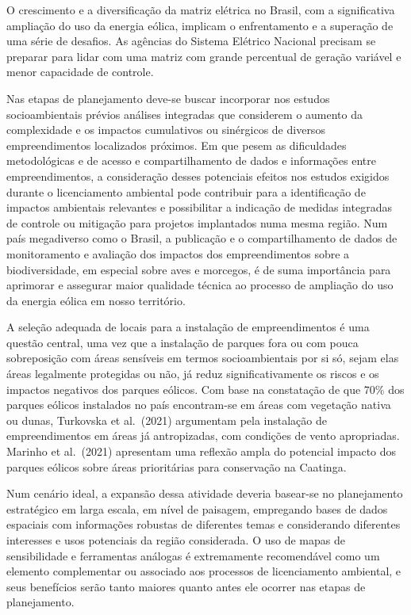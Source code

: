 \documentclass[
  oneside]{scrbook}
\begin{document}
O crescimento e a diversificação da matriz elétrica no Brasil, com a significativa ampliação do uso da energia eólica, implicam o enfrentamento e a superação de uma série de desafios. As agências do Sistema Elétrico Nacional precisam se preparar para lidar com uma matriz com grande percentual de geração variável e menor capacidade de controle.

Nas etapas de planejamento deve-se buscar incorporar nos estudos socioambientais prévios análises integradas que considerem o aumento da complexidade e os impactos cumulativos ou sinérgicos de diversos empreendimentos localizados próximos. Em que pesem as dificuldades metodológicas e de acesso e compartilhamento de dados e informações entre empreendimentos, a consideração desses potenciais efeitos nos estudos exigidos durante o licenciamento ambiental pode contribuir para a identificação de impactos ambientais relevantes e possibilitar a indicação de medidas integradas de controle ou mitigação para projetos implantados numa mesma região. Num país megadiverso como o Brasil, a publicação e o compartilhamento de dados de monitoramento e avaliação dos impactos dos empreendimentos sobre a biodiversidade, em especial sobre aves e morcegos, é de suma importância para aprimorar e assegurar maior qualidade técnica ao processo de ampliação do uso da energia eólica em nosso território.

A seleção adequada de locais para a instalação de empreendimentos é uma questão central, uma vez que a instalação de parques fora ou com pouca sobreposição com áreas sensíveis em termos socioambientais por si só, sejam elas áreas legalmente protegidas ou não, já reduz significativamente os riscos e os impactos negativos dos parques eólicos. Com base na constatação de que 70\% dos parques eólicos instalados no país encontram-se em áreas com vegetação nativa ou dunas, Turkovska et al.~(2021) argumentam pela instalação de empreendimentos em áreas já antropizadas, com condições de vento apropriadas. Marinho et al.~(2021) apresentam uma reflexão ampla do potencial impacto dos parques eólicos sobre áreas prioritárias para conservação na Caatinga.

Num cenário ideal, a expansão dessa atividade deveria basear-se no planejamento estratégico em larga escala, em nível de paisagem, empregando bases de dados espaciais com informações robustas de diferentes temas e considerando diferentes interesses e usos potenciais da região considerada. O uso de mapas de sensibilidade e ferramentas análogas é extremamente recomendável como um elemento complementar ou associado aos processos de licenciamento ambiental, e seus benefícios serão tanto maiores quanto antes ele ocorrer nas etapas de planejamento.
\end{document}
